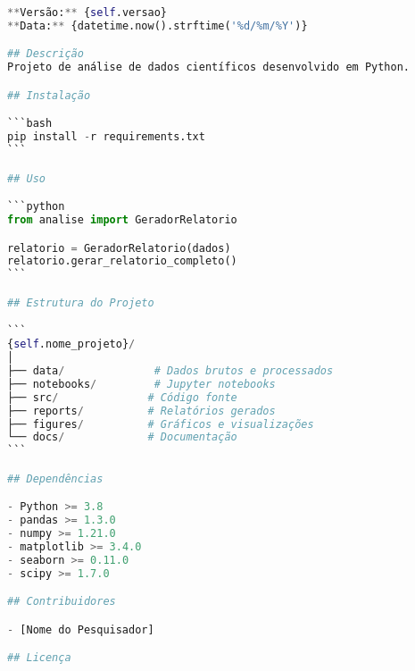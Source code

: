 \begin{pythonbox}
\begin{lstlisting}[language=Python]       
**Versão:** {self.versao}  
**Data:** {datetime.now().strftime('%d/%m/%Y')}

## Descrição
Projeto de análise de dados científicos desenvolvido em Python.

## Instalação

```bash
pip install -r requirements.txt
```

## Uso

```python
from analise import GeradorRelatorio

relatorio = GeradorRelatorio(dados)
relatorio.gerar_relatorio_completo()
```

## Estrutura do Projeto

```
{self.nome_projeto}/
│
├── data/              # Dados brutos e processados
├── notebooks/         # Jupyter notebooks
├── src/              # Código fonte
├── reports/          # Relatórios gerados
├── figures/          # Gráficos e visualizações
└── docs/             # Documentação
```

## Dependências

- Python >= 3.8
- pandas >= 1.3.0
- numpy >= 1.21.0
- matplotlib >= 3.4.0
- seaborn >= 0.11.0
- scipy >= 1.7.0

## Contribuidores

- [Nome do Pesquisador]

## Licença
   \end{lstlisting}
\end{pythonbox}

